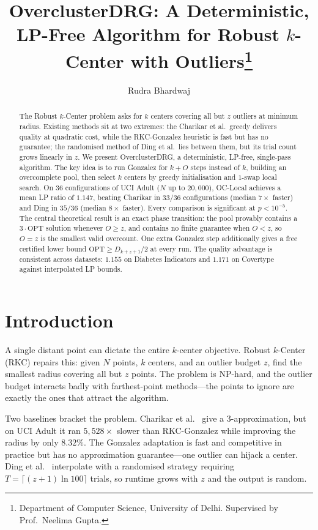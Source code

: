 \documentclass{siam}
\title{OverclusterDRG: A Deterministic, LP-Free Algorithm for
Robust $k$-Center with Outliers\thanks{Department of Computer
Science, University of Delhi. Supervised by Prof.\ Neelima Gupta.}}
\author{Rudra Bhardwaj}
\newcommand{\OPT}{\mathrm{OPT}}
\begin{document}
\maketitle

\begin{abstract}
The Robust $k$-Center problem asks for $k$ centers covering all but
$z$ outliers at minimum radius. Existing methods sit at two extremes:
the Charikar et al.\ greedy delivers quality at quadratic cost, while
the RKC-Gonzalez heuristic is fast but has no guarantee; the
randomised method of Ding et al.\ lies between them, but its trial
count grows linearly in $z$. We present OverclusterDRG, a
deterministic, LP-free, single-pass algorithm. The key idea is to run
Gonzalez for $k+O$ steps instead of $k$, building an overcomplete
pool, then select $k$ centers by greedy initialisation and $1$-swap
local search. On 36 configurations of UCI Adult ($N$ up to $20{,}000$),
OC-Local achieves a mean LP ratio of $1.147$, beating Charikar in
$33/36$ configurations (median $7\times$ faster) and Ding in $35/36$
(median $8\times$ faster). Every comparison is significant at
$p<10^{-5}$. The central theoretical result is an exact phase
transition: the pool provably contains a $3\cdot\OPT$ solution
whenever $O\ge z$, and contains no finite guarantee when $O<z$, so
$O=z$ is the smallest valid overcount. One extra Gonzalez step
additionally gives a free certified lower bound $\OPT\ge D_{k+z+1}/2$
at every run. The quality advantage is consistent across datasets:
$1.155$ on Diabetes Indicators and $1.171$ on Covertype against
interpolated LP bounds.
\end{abstract}

\section{Introduction}

A single distant point can dictate the entire $k$-center objective.
Robust $k$-Center (RKC) repairs this: given $N$ points, $k$ centers,
and an outlier budget $z$, find the smallest radius covering all but
$z$ points. The problem is NP-hard, and the outlier budget interacts
badly with farthest-point methods---the points to ignore are exactly
the ones that attract the algorithm.

Two baselines bracket the problem. Charikar et al.\ \cite{charikar2001}
give a $3$-approximation, but on UCI Adult it ran $5{,}528\times$ slower
than RKC-Gonzalez while improving the radius by only $8.32\%$. The
Gonzalez adaptation is fast and competitive in practice but has no
approximation guarantee---one outlier can hijack a center. Ding et
al.\ \cite{ding2019} interpolate with a randomised strategy requiring
$T=\lceil(z{+}1)\ln 100\rceil$ trials, so runtime grows with $z$ and
the output is random.
\end{document}
